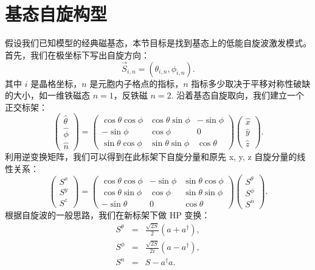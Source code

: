 \documentclass[UTF8]{ctexart}
\begin{document}
\section*{基态自旋构型}
\noindent
假设我们已知模型的经典磁基态，本节目标是找到基态上的低能自旋波激发模式。首先，我们在极坐标下写出自旋方向：
\begin{equation}
\vec{S}_{i,n}=\left(\theta_{i,n},\phi_{i,n}\right).
\end{equation}
其中 $i$ 是晶格坐标，$n$ 是元胞内子格点的指标，$n$ 指标多少取决于平移对称性破缺的大小，如一维铁磁态 $n = 1$，反铁磁 $n = 2$. 沿着基态自旋取向，我们建立一个正交标架：
\begin{equation}
\left(\begin{array}{c}
\hat{\theta}\\
\hat{\phi}\\
\hat{n}
\end{array}\right)=\left(\begin{array}{ccc}
\cos\theta\cos\phi & \cos\theta\sin\phi & -\sin\phi\\
-\sin\phi & \cos\phi & 0\\
\sin\theta\cos\phi & \sin\theta\sin\phi & \cos\theta
\end{array}\right)\left(\begin{array}{c}
\hat{x}\\
\hat{y}\\
\hat{z}
\end{array}\right).
\end{equation}
利用逆变换矩阵，我们可以得到在此标架下自旋分量和原先 x, y, z 自旋分量的线性关系：
\begin{equation}
\left(\begin{array}{c}
S^{x}\\
S^{y}\\
S^{z}
\end{array}\right)=\left(\begin{array}{ccc}
\cos\theta\cos\phi & -\sin\phi & \sin\theta\cos\phi\\
\cos\theta\sin\phi & \cos\phi & \sin\theta\sin\phi\\
-\sin\theta & 0 & \cos\theta
\end{array}\right)\left(\begin{array}{c}
S^{\theta}\\
S^{\phi}\\
S^{n}
\end{array}\right).
\end{equation}
根据自旋波的一般思路，我们在新标架下做 HP 变换：
\begin{eqnarray}
S^{\theta} & = & \frac{\sqrt{2S}}{2}\left(a+a^{\dagger}\right),\\
S^{\phi} & = & \frac{\sqrt{2S}}{2i}\left(a-a^{\dagger}\right),\\
S^{n} & = & S-a^{\dagger}a.
\end{eqnarray}
\end{document}
